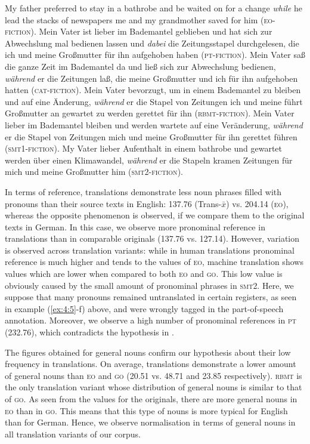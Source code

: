 \documentclass[output=paper]{LSP/langsci}
\begin{document}
\ea \label{ex:4:5}
\ea My father preferred to stay in a bathrobe and be waited on for a change \textit{while} he lead the stacks of newspapers me and my grandmother saved for him (\textsc{eo}-\textsc{fiction}).
\ex Mein Vater ist lieber im Bademantel geblieben und hat sich zur Abwechslung mal bedienen lassen und \textit{dabei} die Zeitungsstapel durchgelesen, die ich und meine Großmutter für ihn aufgehoben haben (\textsc{pt}-\textsc{fiction}).
\ex Mein Vater saß die ganze Zeit im Bademantel da und ließ sich zur Abwechslung bedienen, \textit{während} er die Zeitungen laß, die meine Großmutter und ich für ihn aufgehoben hatten (\textsc{cat}-\textsc{fiction}).
\ex Mein Vater bevorzugt, um in einem Bademantel zu bleiben und auf eine Änderung, \textit{während} er die Stapel von Zeitungen ich und meine führt Großmutter an gewartet zu werden gerettet für ihn (\textsc{rbmt}-\textsc{fiction}). 
\ex Mein Vater lieber im Bademantel bleiben und werden wartete auf eine Veränderung, \textit{während} er die Stapel von Zeitungen mich und meine Großmutter für ihn gerettet führen (\textsc{smt}1-\textsc{fiction}).
\ex My Vater lieber Aufenthalt in einem bathrobe und gewartet werden über einen Klimawandel, \textit{während} er die Stapeln kramen Zeitungen für mich und meine Großmutter him (\textsc{smt}2-\textsc{fiction}).
\z
\z

In terms of reference, translations demonstrate less noun phrases filled with pronouns than their source texts in English: 137.76 (Trans-$\bar{x}$) vs. 204.14 (\textsc{eo}), whereas the opposite phenomenon is observed, if we compare them to the original texts in German. In this case, we observe more pronominal reference in translations than in comparable originals (137.76 vs. 127.14). However, variation is observed across translation variants: while in human translations pronominal reference is much higher and tends to the values of \textsc{eo}, machine translation shows values which are lower when compared to both \textsc{eo} and \textsc{go}. This low value is obviously caused by the small amount of pronominal phrases in \textsc{smt}2. Here, we suppose that many pronouns remained untranslated in certain registers, as seen in example (\ref{ex:4:5}-f) above, and were wrongly tagged in the part-of-speech annotation. Moreover, we observe a high number of pronominal references in \textsc{pt} (232.76), which contradicts the hypothesis in .

The figures obtained for general nouns confirm our hypothesis about their low frequency in translations. On average, translations demonstrate a lower amount of general nouns than \textsc{eo} and \textsc{go} (20.51 vs. 48.71 and 23.85 respectively). \textsc{rbmt} is the only translation variant whose distribution of general nouns is similar to that of \textsc{go}. As seen from the values for the originals, there are more general nouns in \textsc{eo} than in \textsc{go}. This means that this type of nouns is more typical for English than for German. Hence, we observe normalisation in terms of general nouns in all translation variants of our corpus. 
\end{document}
